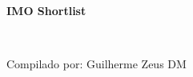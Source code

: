 \begin{center}
    {\fontsize{.8cm}{1cm}\selectfont
    
    \hrulefill\\\vspace{-1.25em}
    \hrulefill\\
    
    \textbf{IMO Shortlist} \\\vspace{-.75em}
    
    \hrulefill\\\vspace{-1.25em}
	\hrulefill

	\vspace{0.1cm}
	}

	{\hfill Compilado por: Guilherme Zeus DM}

    \vspace{1cm}
    
    \fontsize{.40cm}{.5cm}\selectfont
   
	\newcommand\x{$\times$}

%        


\end{center}
